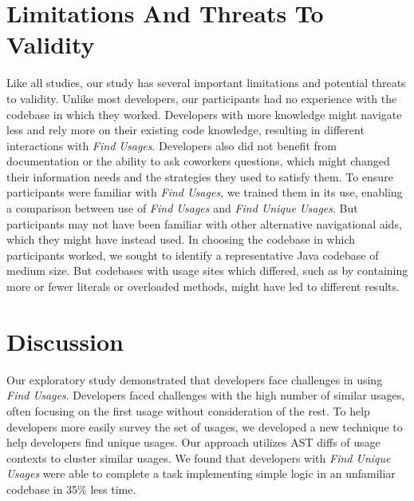 \documentclass[conference]{IEEEtran}
\begin{document}


\section{Limitations And Threats To Validity}
Like all studies, our study has several important limitations and potential threats to validity. 
Unlike most developers, our participants had no experience with the codebase in which they worked. Developers with more knowledge might navigate less and rely more on their existing code knowledge, resulting in different interactions with \textit{Find Usages}. 
Developers also did not benefit from documentation or the ability to ask coworkers questions, which might changed their information needs and the strategies they used to satisfy them. 
To ensure participants were familiar with \textit{Find Usages}, we trained them in its use, enabling a comparison between use of \textit{Find Usages} and \textit{Find Unique Usages}. But participants may not have been familiar with other alternative navigational aids, which they might have instead used. In choosing the codebase in which participants worked, we sought to identify a representative Java codebase of medium size. But codebases with usage sites which differed, such as by containing more or fewer literals or overloaded methods, might have led to different results.



\section{Discussion}
Our exploratory study demonstrated that developers face challenges in using \textit{Find Usages}. Developers faced challenges with the high number of similar usages, often focusing on the first usage without consideration of the rest. To help developers more easily survey the set of usages, we developed a new technique to help developers find unique usages. Our approach utilizes AST diffs of usage contexts to cluster similar usages. We found that developers with \textit{Find Unique Usages} were able to complete a task implementing simple logic in an unfamiliar codebase in 35\% less time. 
\end{document}
